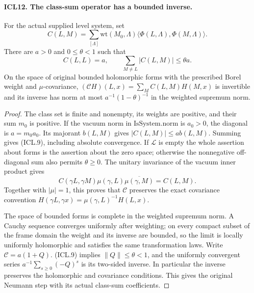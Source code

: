 \paragraph{ICL12. The class-sum operator has a bounded inverse.}
\label{claim:ICL12}
For the actual supplied level system, set
\[
 C(L,M)=\sum_{[\Lambda]}\mathrm{wt}(M_0,\Lambda)
       \langle\Phi(L,\Lambda),\Phi(M,\Lambda)\rangle.
                                                               \tag{ICL.8}
\]
There are \(a>0\) and \(0\leq\theta<1\) such that
\[
 C(L,L)=a,\qquad
 \sum_{M\ne L}|C(L,M)|\leq\theta a.                  \tag{ICL.9}
\]
On the space of original bounded holomorphic forms with
the prescribed Borel weight and \(\mu\)-covariance,
\((\mathcal CH)(L,x)=\sum_M C(L,M)H(M,x)\)
is invertible and its inverse has norm at most
\(a^{-1}(1-\theta)^{-1}\) in the weighted supremum norm.
\begin{proof}
The class set is finite and nonempty, its weights are
positive, and their sum \(m_0\) is positive.  If the
vacuum norm in \(\mathrm{IsSystem.norm}\) is \(a_0>0\),
the diagonal is \(a=m_0a_0\).  Its majorant \(b(L,M)\)
gives \(|C(L,M)|\leq a b(L,M)\).  Summing gives
(ICL.9), including absolute convergence.  If
\(\mathcal L\) is empty the whole assertion about forms
is the assertion about the zero space; otherwise the
nonnegative off-diagonal sum also permits \(\theta\geq0\).
The unitary invariance of the vacuum inner product gives
\[
 C(\gamma L,\gamma M)\mu(\gamma,L)
                \overline{\mu(\gamma,M)}=C(L,M).
\]
Together with \(|\mu|=1\), this proves that
\(\mathcal C\) preserves the exact covariance convention
\(H(\gamma L,\gamma x)=\mu(\gamma,L)^{-1}H(L,x)\).

The space of bounded forms is complete in the weighted
supremum norm.  A Cauchy sequence converges uniformly after
weighting; on every compact subset of the frame domain
the weight and its inverse are bounded, so the limit is
locally uniformly holomorphic and satisfies the same
transformation laws.  Write \(\mathcal C=a(1+Q)\).
(ICL.9) implies \(\|Q\|\leq\theta<1\), and the uniformly
convergent series
\(a^{-1}\sum_{s\geq0}(-Q)^s\) is its two-sided inverse.
In particular the inverse preserves the holomorphic and
covariance conditions.  This gives the original Neumann
step with its actual class-sum coefficients.
\end{proof}

